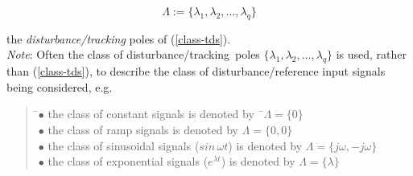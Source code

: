\documentclass[a4paper,11pt]{article} %
\theoremstyle{plain} %
{\theorembodyfont{\normalfont}
\newtheorem{Exa}{Example}}
\def\dt{disturbance/tracking}
\begin{document}
\begin{equation}
  \Lambda := \{\lambda_1, \lambda_2, \ldots ,\lambda_q \}
\end{equation}

the {\em \dt} poles\cite[pp.95--96]{masten1} of (\ref{class-tds}).\\%

{\em Note}: Often the class of \dt\ poles $\{\lambda_1, \lambda_2,
\ldots ,\lambda_q \}$ is used, rather than (\ref{class-tds}), to
describe the class of disturbance/reference input signals being
considered, e.g.

\begin{quote}
\begin{tabbing}
\=$\bullet$ the class of constant signals is denoted by \qquad\qquad\ \=$\Lambda = \{0\}$ \\%
\>$\bullet$ the class of ramp signals is denoted by  \>$\Lambda = \{0,0\}$ \\%
\>$\bullet$ the class of sinusoidal signals ($sin \, \omega t$) is denoted by \>$\Lambda = \{j\omega,-j\omega \}$ \\%
\>$\bullet$ the class of exponential signals ($e^{\lambda t}$) is denoted by  \>$\Lambda = \{\lambda\}$ \\%
\end{tabbing}
\end{quote}
\end{document}
